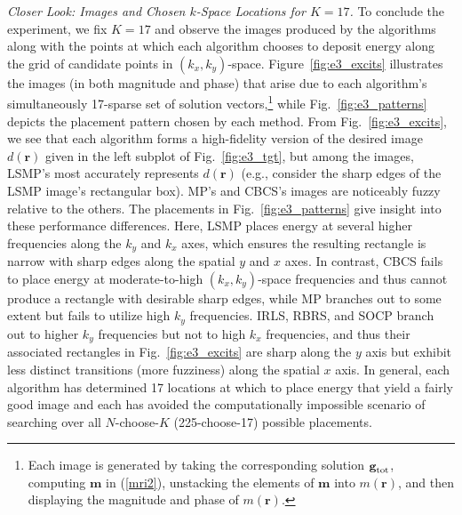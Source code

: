 \documentclass[final]{siamltex}
\newcommand{\la}[1]{\mbox{$\mathbf{#1}$}}  \newcommand{\sst}[1]{\mbox{\scriptsize{#1}}}
\begin{document}
   {\em{Closer Look: Images and Chosen $k$-Space Locations for
   $K=17$}.}  To conclude the experiment, we fix $K = 17$ and observe
   the images produced by the algorithms along with the points at
   which each algorithm chooses to deposit energy along the grid of
   candidate points in $(k_x, k_y)$-space.  Figure~\ref{fig:e3_excits}
   illustrates the images (in both magnitude and phase) that arise due
   to each algorithm's simultaneously 17-sparse set of solution
   vectors,\footnote{Each image is generated by taking the
   corresponding solution $\la{g}_{\sst{tot}}$, computing $\la{m}$ in
   (\ref{mri2}), unstacking the elements of $\la{m}$ into $m(\la{r})$,
   and then displaying the magnitude and phase of $m(\la{r})$.} while
   Fig.~\ref{fig:e3_patterns} depicts the placement pattern chosen by
   each method.  From Fig.~\ref{fig:e3_excits}, we see that each
   algorithm forms a high-fidelity version of the desired image
   $d(\la{r})$ given in the left subplot of Fig.~\ref{fig:e3_tgt}, but
   among the images, LSMP's most accurately represents $d(\la{r})$
   (e.g., consider the sharp edges of the LSMP image's rectangular
   box).  MP's and CBCS's images are noticeably fuzzy relative to the
   others.  The placements in Fig.~\ref{fig:e3_patterns} give insight
   into these performance differences.  Here, LSMP places energy at
   several higher frequencies along the $k_y$ and $k_x$ axes, which
   ensures the resulting rectangle is narrow with sharp edges along
   the spatial $y$ and $x$ axes.  In contrast, CBCS fails to place
   energy at moderate-to-high $(k_x, k_y)$-space frequencies and thus
   cannot produce a rectangle with desirable sharp edges, while MP
   branches out to some extent but fails to utilize high $k_y$
   frequencies.  IRLS, RBRS, and SOCP branch out to higher $k_y$
   frequencies but not to high $k_x$ frequencies, and thus their
   associated rectangles in Fig.~\ref{fig:e3_excits} are sharp along
   the $y$ axis but exhibit less distinct transitions (more fuzziness)
   along the spatial $x$ axis.  In general, each algorithm has
   determined 17 locations at which to place energy that yield a
   fairly good image and each has avoided the computationally
   impossible scenario of searching over all $N$-choose-$K$
   (225-choose-17) possible placements.
\end{document}
